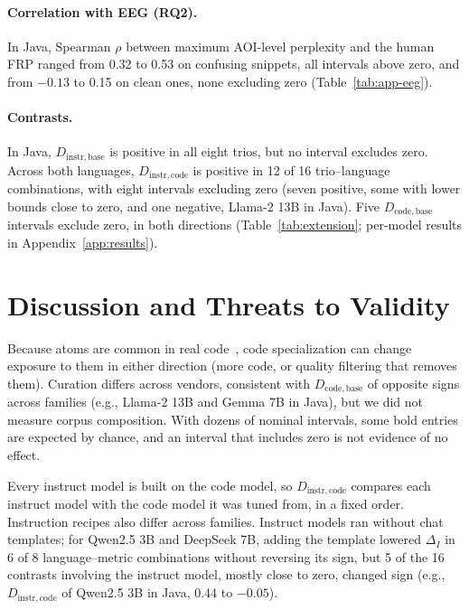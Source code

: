 \documentclass[sigconf,nonacm]{acmart}
\newcommand{\Dcb}{D_{\mathrm{code},\mathrm{base}}}
\newcommand{\Dic}{D_{\mathrm{instr},\mathrm{code}}}
\newcommand{\Dib}{D_{\mathrm{instr},\mathrm{base}}}
\begin{document}
\paragraph{Correlation with EEG (RQ2).}
In Java, Spearman $\rho$ between maximum AOI-level perplexity and the human FRP ranged from 0.32 to 0.53 on confusing snippets, all intervals above zero, and from $-0.13$ to 0.15 on clean ones, none excluding zero (Table~\ref{tab:app-eeg}).

\paragraph{Contrasts.}
In Java, $\Dib$ is positive in all eight trios, but no interval excludes zero.
Across both languages, $\Dic$ is positive in 12 of 16 trio--language combinations, with eight intervals excluding zero (seven positive, some with lower bounds close to zero, and one negative, Llama-2 13B in Java). Five $\Dcb$ intervals exclude zero, in both directions (Table~\ref{tab:extension}; per-model results in Appendix~\ref{app:results}).

\section{Discussion and Threats to Validity}
\label{sec:discussion}
Because atoms are common in real code~\cite{tabosa2024}, code specialization can change exposure to them in either direction (more code, or quality filtering that removes them). Curation differs across vendors, consistent with $\Dcb$ of opposite signs across families (e.g., Llama-2 13B and Gemma 7B in Java), but we did not measure corpus composition.
With dozens of nominal intervals, some bold entries are expected by chance, and an interval that includes zero is not evidence of no effect.

Every instruct model is built on the code model, so $\Dic$ compares each instruct model with the code model it was tuned from, in a fixed order. Instruction recipes also differ across families.
Instruct models ran without chat templates; for Qwen2.5 3B and DeepSeek 7B, adding the template lowered $\Delta_I$ in 6 of 8 language--metric combinations without reversing its sign, but 5 of the 16 contrasts involving the instruct model, mostly close to zero, changed sign (e.g., $\Dic$ of Qwen2.5 3B in Java, 0.44 to $-0.05$).
\end{document}
